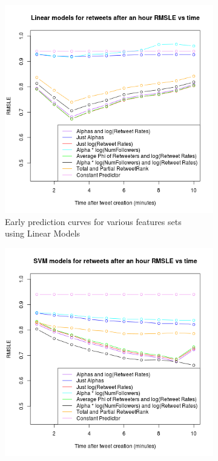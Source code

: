 \begin{figure}
  \centering
  \begin{subfigure}[b]{0.45\textwidth}
    \includegraphics[width=\textwidth]{../src/Analysis/linearattempts.png}
    \caption{Early prediction curves for various features sets\\ using Linear Models}
    \label{fig:linearattempts}  
  \end{subfigure}%
  \begin{subfigure}[b]{0.45\textwidth}
    \includegraphics[width=\textwidth]{../src/Analysis/svmattempts.png}

\end{subfigure}
\end{figure}
